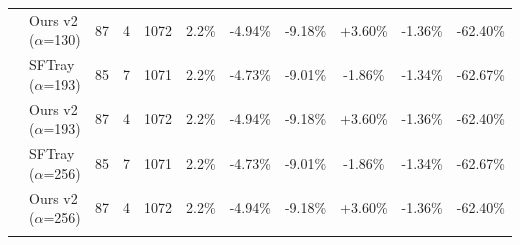\begin{table}[t]
{\begin{tabular}{ll|cccc|ccc|cc}
 & Ours v2 ($\alpha$=130) & 87 & 4 & 1072 & 2.2\% & -4.94\% & -9.18\% & +3.60\% & -1.36\% & -62.40\% \\

\addlinespace[0.3em]

 & SFTray ($\alpha$=193) & 85 & 7 & 1071 & 2.2\% & -4.73\% & -9.01\% & -1.86\% & -1.34\% & -62.67\% \\

 & Ours v2 ($\alpha$=193) & 87 & 4 & 1072 & 2.2\% & -4.94\% & -9.18\% & +3.60\% & -1.36\% & -62.40\% \\

\addlinespace[0.3em]

 & SFTray ($\alpha$=256) & 85 & 7 & 1071 & 2.2\% & -4.73\% & -9.01\% & -1.86\% & -1.34\% & -62.67\% \\

 & Ours v2 ($\alpha$=256) & 87 & 4 & 1072 & 2.2\% & -4.94\% & -9.18\% & +3.60\% & -1.36\% & -62.40\% \\

\addlinespace[0.3em]

\midrule

\bottomrule

\end{tabular}

}

\end{table}
